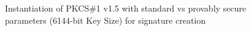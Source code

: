 \documentclass[]{final_report}
\theoremstyle{definition}
\begin{document}
\begin{figure}[H]
    \centering %
     \caption{Instantiation of PKCS\#1 v1.5 with standard vs provably secure parameters (6144-bit Key Size) for signature creation}
    \begin{minipage}{\textwidth}
        \centering
    \end{minipage}
         \label{pkcs_sign_6144bit_table}
\end{figure}
\end{document}
